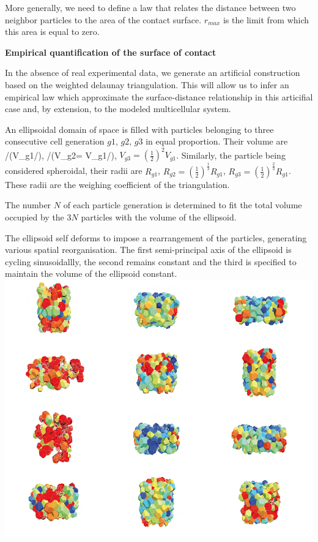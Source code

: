 More generally, we need to define a law that relates the distance between two neighbor particles to the area of the contact surface. $r_{max}$ is the limit from which this area is equal to zero.

\textbf{Empirical quantification of the surface of contact}

In the absence of real experimental data, we generate an artificial construction based on the weighted delaunay triangulation. This will allow us to infer an empirical law which approximate the surface-distance relationship in this articifial case and, by extension, to the modeled multicellular system.

An ellipsoidal domain of space is filled with particles belonging to three consecutive cell generation $g1$, $g2$, $g3$ in equal proportion. Their volume are /(V_{g1}/), /(V_{g2}=   V_{g1}/), $V_{g3} = \left ( \frac{1}{2} \right )^{2} V_{g1}$. Similarly, the particle being considered spheroidal, their radii are $R_{g1}$, $R_{g2} = \left ( \frac{1}{2} \right )^{\frac{1}{3}} R_{g1}$, $R_{g3} = \left ( \frac{1}{2} \right )^{\frac{2}{3}} R_{g1}$. These radii are the weighing coefficient of the triangulation.

The number $N$ of each particle generation is determined to fit the total volume occupied by the $3N$ particles with the volume of the ellipsoid.

The ellipsoid self deforms to impose a rearrangement of the particles, generating various spatial reorganisation. The first semi-principal axis of the ellipsoid is cycling sinusoidallly, the second remains constant and the third is specified to maintain the volume of the ellipsoid constant.
\includegraphics{../../images/MECAGEN/spatial_neighb/surf_dist_movie_1677cells_gS11_filtered_SNAPSHOT/Fusion_light.png}

